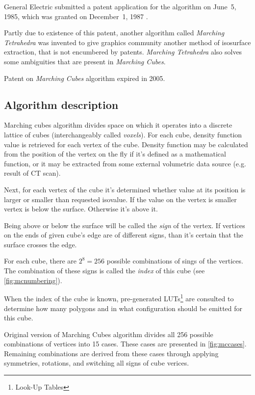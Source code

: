 General Electric submitted a patent application for the algorithm on
June~5, 1985, which was granted on December~1, 1987 \parencite{mcpatent}.

Partly due to existence of this patent, another algorithm called
\emph{Marching Tetrahedra} was invented to give graphics community another
method of isosurface extraction, that is not encumbered by patents.
\emph{Marching Tetrahedra} also solves some ambiguities that are present in
\emph{Marching Cubes}.

Patent on \emph{Marching Cubes} algorithm expired in 2005.

\subsection{Algorithm description \parencite{Lorensen:1987:MCH:37402.37422}}
\label{sec:mcdesc}

Marching cubes algorithm divides space on which it operates into a discrete
lattice of cubes (interchangeably called \emph{voxels}). For each cube, density
function value is retrieved for each vertex of the cube. Density function may be
calculated from the position of the vertex on the fly if it's defined as a
mathematical function, or it may be extracted from some external volumetric data
source (e.g. result of CT scan).

Next, for each vertex of the cube it's determined whether value at its position
is larger or smaller than requested isovalue. If the value on the vertex is
smaller vertex is below the surface. Otherwise it's above it.

Being above or below the surface will be called the \emph{sign} of the vertex.
If vertices on the ends of given cube's edge are of different signs, than it's
certain that the surface crosses the edge.

For each cube, there are $2^8=256$ possible combinations of sings of the
vertices.  The combination of these signs is called the
\emph{index} of this cube (see \autoref{fig:mcnumbering}).

When the index of the cube is known, pre-generated LUTs\footnote{Look-Up Tables}
are consulted to determine how many polygons and in what configuration should be
emitted for this cube.

Original version of Marching Cubes algorithm divides all 256 possible
combinations of vertices into 15 cases. These cases are presented in
\autoref{fig:mccases}. Remaining combinations are derived from these cases
through applying symmetries, rotations, and switching all signs of cube verices.

